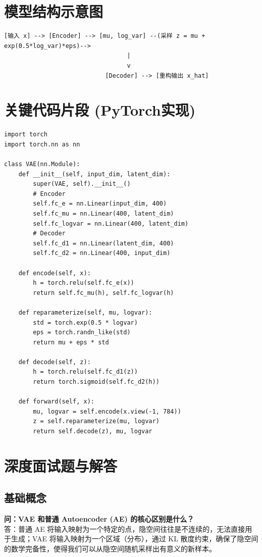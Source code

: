 \documentclass[12pt, a4paper]{book}
\begin{document}
\section{模型结构示意图}
\begin{verbatim}
[输入 x] --> [Encoder] --> [mu, log_var] --(采样 z = mu + exp(0.5*log_var)*eps)-->
                                  |
                                  v
                            [Decoder] --> [重构输出 x_hat]
\end{verbatim}

\section{关键代码片段 (PyTorch实现)}
\begin{lstlisting}
import torch
import torch.nn as nn

class VAE(nn.Module):
    def __init__(self, input_dim, latent_dim):
        super(VAE, self).__init__()
        # Encoder
        self.fc_e = nn.Linear(input_dim, 400)
        self.fc_mu = nn.Linear(400, latent_dim)
        self.fc_logvar = nn.Linear(400, latent_dim)
        # Decoder
        self.fc_d1 = nn.Linear(latent_dim, 400)
        self.fc_d2 = nn.Linear(400, input_dim)

    def encode(self, x):
        h = torch.relu(self.fc_e(x))
        return self.fc_mu(h), self.fc_logvar(h)

    def reparameterize(self, mu, logvar):
        std = torch.exp(0.5 * logvar)
        eps = torch.randn_like(std)
        return mu + eps * std

    def decode(self, z):
        h = torch.relu(self.fc_d1(z))
        return torch.sigmoid(self.fc_d2(h))

    def forward(self, x):
        mu, logvar = self.encode(x.view(-1, 784))
        z = self.reparameterize(mu, logvar)
        return self.decode(z), mu, logvar
\end{lstlisting}

\section{深度面试题与解答}
\subsection{基础概念}
\textbf{问：VAE 和普通 Autoencoder (AE) 的核心区别是什么？}\\
答：普通 AE 将输入映射为一个特定的点，隐空间往往是不连续的，无法直接用于生成；VAE 将输入映射为一个区域（分布），通过 KL 散度约束，确保了隐空间的数学完备性，使得我们可以从隐空间随机采样出有意义的新样本。
\end{document}

